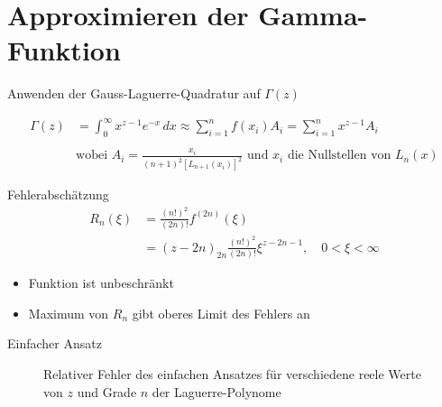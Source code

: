 \section{Approximieren der Gamma-Funktion}

\begin{frame}{Anwenden der Gauss-Laguerre-Quadratur auf $\Gamma(z)$}

\begin{align*}
\Gamma(z)
 & =
\int_0^\infty x^{z-1} e^{-x} \, dx
\approx
\sum_{i=1}^{n} f(x_i) A_i
=
\sum_{i=1}^{n} x^{z-1} A_i
\\\\
 & \text{wobei }
A_i = \frac{x_i}{(n+1)^2 \left[ L_{n+1}(x_i) \right]^2}
\text{ und $x_i$ die Nullstellen von $L_n(x)$}
\end{align*}

\end{frame}

\begin{frame}{Fehlerabschätzung}
\begin{align*}
R_n(\xi)
 & =
\frac{(n!)^2}{(2n)!} f^{(2n)}(\xi)
\\
 & =
(z - 2n)_{2n} \frac{(n!)^2}{(2n)!} \xi^{z - 2n - 1}
,\quad
0 < \xi < \infty
\end{align*}

\begin{itemize}
\item Funktion ist unbeschränkt
\item Maximum von $R_n$ gibt oberes Limit des Fehlers an
\end{itemize}
\end{frame}

\begin{frame}{Einfacher Ansatz}

\begin{figure}[h]
\centering
\scalebox{0.91}{}
\caption{Relativer Fehler des einfachen Ansatzes für verschiedene reele Werte
von $z$ und Grade $n$ der Laguerre-Polynome}
\end{figure}

\end{frame}

